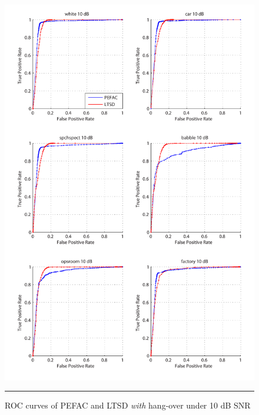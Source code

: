 \begin{figure}[htbp]
	\centering
		\includegraphics[width=1.0\columnwidth]{Figures/Chapter5/pefac10.pdf}
		\rule{37em}{0.5pt}
	\caption[ROC curves of PEFAC and LTSD \emph{with} hang-over under 10 dB SNR]{ROC curves of PEFAC and LTSD \emph{with} hang-over under 10 dB SNR}
	\label{fig:pefac10}
\end{figure}